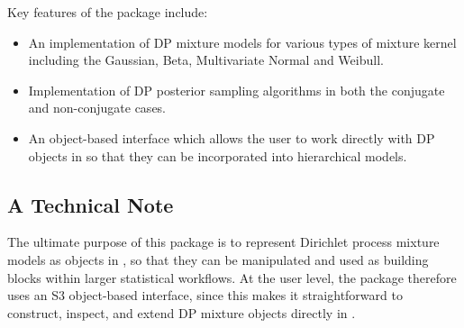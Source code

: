 \documentclass[nojss]{jss}
\begin{document}


Key features of the  package include:
\begin{itemize}
\item An implementation of DP mixture models for various types of mixture kernel including the Gaussian, Beta, Multivariate Normal and Weibull.
\item Implementation of DP posterior sampling algorithms in both the conjugate and non-conjugate cases.
\item An object-based interface which allows the user to work directly with DP objects in  so that they can be incorporated into hierarchical models.
\end{itemize}

\subsection{A Technical Note}

The ultimate purpose of this package is to represent Dirichlet process mixture models as
objects in , so that they can be manipulated and used as building blocks within
larger statistical workflows. At the user level, the package therefore uses an S3 object-based
interface, since this makes it straightforward to construct, inspect, and extend DP mixture
objects directly in .
\end{document}
